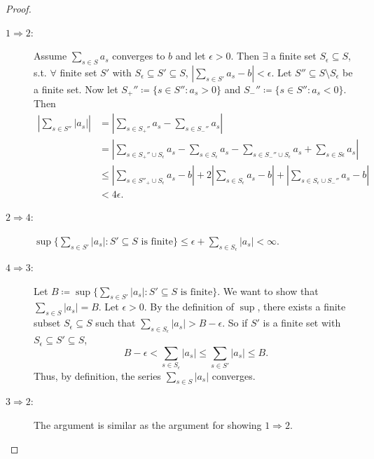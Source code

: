 \documentclass[12pt]{article}
\theoremstyle{plain}
\theoremstyle{definition}
\begin{document}
\begin{proof}
    \begin{description}
        \item [$1\Rightarrow 2$:]
            Assume $\sum_{s\in S} a_s$ converges to $b$ and let $\epsilon>0$.
            Then $\exists$ a finite set $S_\epsilon\subseteq S$, s.t. $\forall$ finite set $S'$ with
            $S_\epsilon\subseteq S'\subseteq S$, $\left| \sum_{s\in S'} a_s -b\right|<\epsilon$.
            Let $S''\subseteq S\setminus S_\epsilon$ be a finite set.
            Now let $S_+''\coloneqq \{s\in S'':a_s>0\}$ and $S_-''\coloneqq \{s\in S'':a_s<0\}$.
            Then 
            \[\begin{aligned}
            \left|\sum_{s\in S''} |a_s|\right|
            &= \left|\sum_{s\in S_+''}a_s - \sum_{s\in S_-''}a_s\right|\\
            &= \left|\sum_{s\in S_+''\cup S_\epsilon}a_s - \sum_{s\in S_\epsilon}a_s - 
            \sum_{s\in S_-''\cup S_\epsilon}a_s + \sum_{s\in S\epsilon}a_s\right|\\
            &\leq \left| \sum_{s\in S''_+\cup S_\epsilon} a_s-b\right| + 2\left| \sum_{s\in S_\epsilon}a_s-b\right|
            +\left|\sum_{s\in S_\epsilon\cup S_-''} a_s-b\right|\\
            &< 4\epsilon.
            \end{aligned}\]

        \item [$2\Rightarrow 4$:]
            $\sup\{\sum_{s\in S'} |a_s|: S'\subseteq S \text{ is finite}\}\leq \epsilon + \sum_{s\in
            S_\epsilon}|a_s|<\infty$.

        \item [$4\Rightarrow 3$:]
            Let $B\coloneqq \sup \{\sum_{s\in S'}|a_s|:S'\subseteq S \text{ is finite}\}$.
            We want to show that $\sum_{s\in S}|a_s|=B$.
            Let $\epsilon>0$.
            By the definition of $\sup$, there exists a finite subset $S_\epsilon\subseteq S$ such that
            $\sum_{s\in S_\epsilon}|a_s| > B-\epsilon$.
            So if $S'$ is a finite set with $S_\epsilon\subseteq S'\subseteq S$,
            $$B-\epsilon<\sum_{s\in S_\epsilon}|a_s|\leq \sum_{s\in S'}|a_s|\leq B.$$
            Thus, by definition, the series $\sum_{s\in S}|a_s|$ converges.

        \item[$3\Rightarrow 2$:]
            The argument is similar as the argument for showing $1\Rightarrow 2$.


\end{description}
\end{proof}
\end{document}
